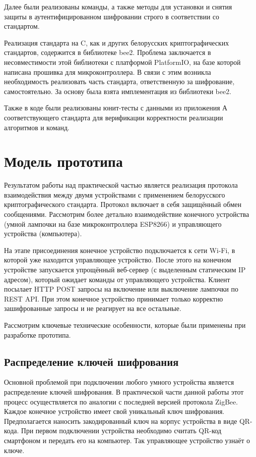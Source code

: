 	Далее были реализованы команды, а также методы для установки и снятия защиты в аутентифицированном 
	шифровании строго в соответствии со стандартом.
	
	Реализация стандарта на C, как и других белорусских криптографических стандартов, содержится 
	в библиотеке bee2. Проблема заключается в несовместимости этой библиотеки с платформой PlatformIO,
	на базе которой написана прошивка для микроконтроллера. В связи с этим возникла необходимость
	реализовать часть стандарта, ответственную за шифрование, самостоятельно. За основу была взята
	имплементация из библиотеки bee2.
	
	Также в коде были реализованы юнит-тесты с данными из приложения А соответствующего стандарта для
	верификации корректности реализации алгоритмов и команд.

	
	\section{Модель прототипа}
	
	Результатом работы над практической частью является реализация протокола взаимодействия между
	двумя устройствами с применением белорусского криптографического стандарта. Протокол
	включает в себя защищённый обмен сообщениями. Рассмотрим более детально взаимодействие конечного
	устройства (умной лампочки на базе микроконтроллера ESP8266) и управляющего устройства (компьютера).
	
	На этапе присоединения конечное устройство подключается к сети Wi-Fi, в которой уже находится
	управляющее устройство. После этого на конечном устройстве запускается упрощённый веб-сервер
	(с выделенным статическим IP адресом),
	который ожидает команды от управляющего устройства. Клиент посылает HTTP POST запросы на
	включение или выключение лампочки по REST API. При этом конечное устройство принимает только 
	корректно зашифрованные запросы и не реагирует на все остальные.
	
	Рассмотрим ключевые технические особенности, которые были применены при разработке прототипа.
	
	\subsection{Распределение ключей шифрования}
	
	Основной проблемой при подключении любого умного устройства является распределение ключей
	шифрования. В практической части данной работы этот процесс осуществляется по аналогии с последней
	версией протокола ZigBee. Каждое конечное устройство имеет свой уникальный ключ шифрования.
	Предполагается наносить закодированный ключ на корпус устройства в виде QR-кода. При первом подключении
	устройства необходимо считать QR-код смартфоном и передать его на компьютер. Так управляющее
	устройство узнаёт о ключе.
	
